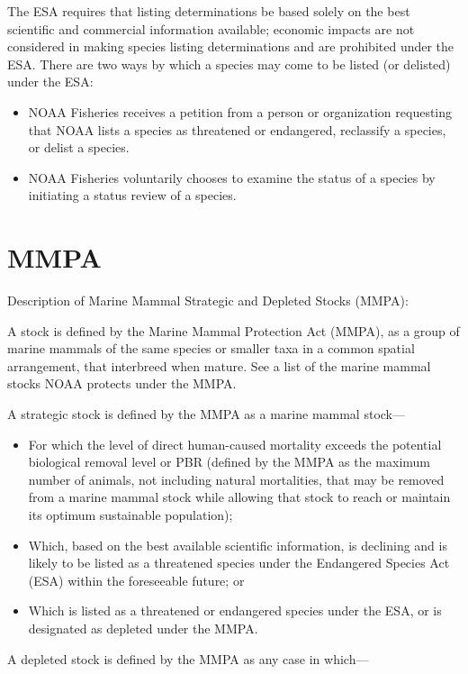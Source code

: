 \documentclass[
]{book}
\begin{document}
The ESA requires that listing determinations be based solely on the best scientific and commercial information available; economic impacts are not considered in making species listing determinations and are prohibited under the ESA. There are two ways by which a species may come to be listed (or delisted) under the ESA:

\begin{itemize}
\item
  NOAA Fisheries receives a petition from a person or organization requesting that NOAA lists a species as threatened or endangered, reclassify a species, or delist a species.
\item
  NOAA Fisheries voluntarily chooses to examine the status of a species by initiating a status review of a species.
\end{itemize}

\hypertarget{mmpa}{%
\section{MMPA}\label{mmpa}}

Description of Marine Mammal Strategic and Depleted Stocks (MMPA):

A stock is defined by the Marine Mammal Protection Act (MMPA), as a group of marine mammals of the same species or smaller taxa in a common spatial arrangement, that interbreed when mature. See a list of the marine mammal stocks NOAA protects under the MMPA.

A strategic stock is defined by the MMPA as a marine mammal stock---

\begin{itemize}
\item
  For which the level of direct human-caused mortality exceeds the potential biological removal level or PBR (defined by the MMPA as the maximum number of animals, not including natural mortalities, that may be removed from a marine mammal stock while allowing that stock to reach or maintain its optimum sustainable population);
\item
  Which, based on the best available scientific information, is declining and is likely to be listed as a threatened species under the Endangered Species Act (ESA) within the foreseeable future; or
\item
  Which is listed as a threatened or endangered species under the ESA, or is designated as depleted under the MMPA.
\end{itemize}

A depleted stock is defined by the MMPA as any case in which---
\end{document}
